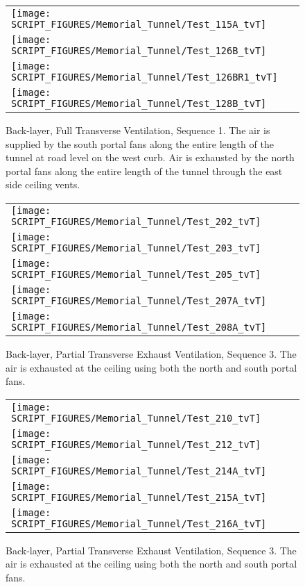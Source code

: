 \begin{figure}[p]
\begin{tabular*}{\textwidth}{l}
\texttt{[image: SCRIPT\_FIGURES/Memorial\_Tunnel/Test\_115A\_tvT]} \\
\texttt{[image: SCRIPT\_FIGURES/Memorial\_Tunnel/Test\_126B\_tvT]} \\
\texttt{[image: SCRIPT\_FIGURES/Memorial\_Tunnel/Test\_126BR1\_tvT]} \\
\texttt{[image: SCRIPT\_FIGURES/Memorial\_Tunnel/Test\_128B\_tvT]}
\end{tabular*}
\caption[Back-layer, Full Transverse Ventilation, Sequence 1]{Back-layer, Full Transverse Ventilation, Sequence 1. The air is supplied by the south portal fans along the entire length of the tunnel at road level on the west curb. Air is exhausted by the north portal fans along the entire length of the tunnel through the east side ceiling vents.}
\label{Memorial_Tunnel_Seq_1d}
\end{figure}

\begin{figure}[p]
\begin{tabular*}{\textwidth}{l}
\texttt{[image: SCRIPT\_FIGURES/Memorial\_Tunnel/Test\_202\_tvT]} \\
\texttt{[image: SCRIPT\_FIGURES/Memorial\_Tunnel/Test\_203\_tvT]} \\
\texttt{[image: SCRIPT\_FIGURES/Memorial\_Tunnel/Test\_205\_tvT]} \\
\texttt{[image: SCRIPT\_FIGURES/Memorial\_Tunnel/Test\_207A\_tvT]} \\
\texttt{[image: SCRIPT\_FIGURES/Memorial\_Tunnel/Test\_208A\_tvT]}
\end{tabular*}
\caption[Back-layer, Partial Transverse Exhaust Ventilation, Sequence 3]{Back-layer, Partial Transverse Exhaust Ventilation, Sequence 3. The air is exhausted at the ceiling using both the north and south portal fans.}
\label{Memorial_Tunnel_Seq_3a}
\end{figure}

\begin{figure}[p]
\begin{tabular*}{\textwidth}{l}
\texttt{[image: SCRIPT\_FIGURES/Memorial\_Tunnel/Test\_210\_tvT]} \\
\texttt{[image: SCRIPT\_FIGURES/Memorial\_Tunnel/Test\_212\_tvT]} \\
\texttt{[image: SCRIPT\_FIGURES/Memorial\_Tunnel/Test\_214A\_tvT]} \\
\texttt{[image: SCRIPT\_FIGURES/Memorial\_Tunnel/Test\_215A\_tvT]} \\
\texttt{[image: SCRIPT\_FIGURES/Memorial\_Tunnel/Test\_216A\_tvT]}
\end{tabular*}
\caption[Back-layer, Partial Transverse Exhaust Ventilation, Sequence 3]{Back-layer, Partial Transverse Exhaust Ventilation, Sequence 3. The air is exhausted at the ceiling using both the north and south portal fans.}
\label{Memorial_Tunnel_Seq_3b}
\end{figure}

